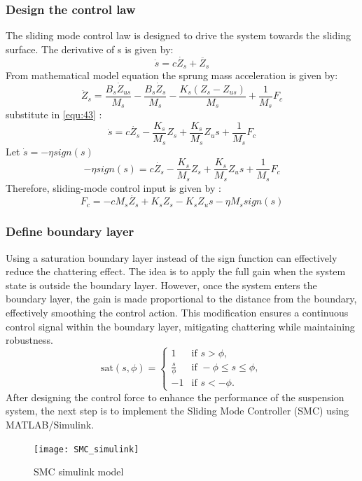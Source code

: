 \newpage
\subsubsection{Design the control law}
The sliding mode control law is designed to drive the system towards the sliding surface.
The derivative of s is given by:
\begin{equation}
	\dot{s} = c\dot{Z_s}+\ddot{Z_s}
	\label{equ:43}
\end{equation}
From mathematical model equation the sprung mass acceleration is given by:
\begin{equation}
	\ddot{Z}_s = \frac{B_s\dot{Z}_{us}}{M_s} - \frac{B_s\dot{Z}_s}{M_s} - \frac{K_s(Z_s - Z_{us})}{M_s} + \frac{1}{M_s}F_c
\end{equation}
substitute in \ref{equ:43} :
\begin{equation}
	\dot{s} = c\dot{Z_s}-\frac{K_s}{M_s}Z_s + \frac{K_s}{M_s}Z_us + \frac{1}{M_s}F_c
\end{equation}
Let $\dot{s} = -\eta sign\left(s\right) $
\begin{equation}
	-\eta sign\left(s\right)= c\dot{Z_s}-\frac{K_s}{M_s}Z_s + \frac{K_s}{M_s}Z_us + \frac{1}{M_s}F_c
\end{equation}
Therefore, sliding-mode control input is given by :
\begin{equation}
	F_c= -cM_s\dot{Z_s}+K_sZ_s - K_sZ_us -\eta M_s sign\left(s\right)
\end{equation}
\subsubsection{Define boundary layer}
Using a saturation boundary layer instead of the sign function can effectively reduce the chattering effect. The idea is to apply the full gain when the system state is outside the boundary layer. However, once the system enters the boundary layer, the gain is made proportional to the distance from the boundary, effectively smoothing the control action. This modification ensures a continuous control signal within the boundary layer, mitigating chattering while maintaining robustness.
\begin{equation}
	\text{sat}(s, \phi) =
	\begin{cases} 
		1 & \text{if } s > \phi, \\
		\frac{s}{\phi} & \text{if } -\phi \leq s \leq \phi, \\
		-1 & \text{if } s < -\phi.
	\end{cases}
\end{equation}
After designing the control force to enhance the performance of the suspension system, the next step is to implement the Sliding Mode Controller (SMC) using MATLAB/Simulink.
\begin{figure}[H]
	\centering
	\texttt{[image: SMC\_simulink]}
	\caption{SMC simulink model 
	}
\end{figure}

